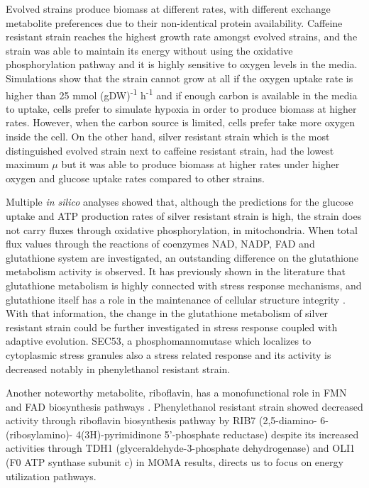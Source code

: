 Evolved strains produce biomass at different rates, with different exchange metabolite preferences due to their non-identical protein availability. Caffeine resistant strain reaches the highest growth rate amongst evolved strains, and the strain was able to maintain its energy without using the oxidative phosphorylation pathway and it is highly sensitive to oxygen levels in the media. Simulations show that the strain cannot grow at all if the oxygen uptake rate is higher than 25 mmol (gDW)\textsuperscript{-1} h\textsuperscript{-1} and if enough carbon is available in the media to uptake, cells prefer to simulate hypoxia in order to produce biomass at higher rates. However, when the carbon source is limited, cells prefer take more oxygen inside the cell. On the other hand, silver resistant strain which is the most distinguished evolved strain next to caffeine resistant strain, had the lowest maximum $\mu$ but it was able to produce biomass at higher rates under higher oxygen and glucose uptake rates compared to other strains.

Multiple \emph{in silico} analyses showed that, although the predictions for the glucose uptake and ATP production rates of silver resistant strain is high, the strain does not carry fluxes through oxidative phosphorylation, in mitochondria. When total flux values through the reactions of coenzymes NAD, NADP, FAD and glutathione system are investigated, an outstanding difference on the glutathione metabolism activity is observed. It has previously shown in the literature that glutathione metabolism is highly connected with stress response mechanisms, and glutathione itself has a role in the maintenance of cellular structure integrity \cite{penninckx2002overview}. With that information, the change in the glutathione metabolism of silver resistant strain could be further investigated in stress response coupled with adaptive evolution. SEC53, a phosphomannomutase which localizes to cytoplasmic stress granules also a stress related response\cite{kepes1988yeast} and its activity is decreased notably in phenylethanol resistant strain.

Another noteworthy metabolite, riboflavin, has a monofunctional role in FMN and FAD biosynthesis pathways \cite{oltmanns1972biosynthesis}. Phenylethanol resistant strain showed decreased activity through riboflavin biosynthesis pathway by RIB7 (2,5-diamino- 6-(ribosylamino)- 4(3H)-pyrimidinone 5'-phosphate reductase) despite its increased activities through TDH1 (glyceraldehyde-3-phosphate dehydrogenase) and OLI1 (F0 ATP synthase subunit c) in MOMA results, directs us to focus on energy utilization pathways.


